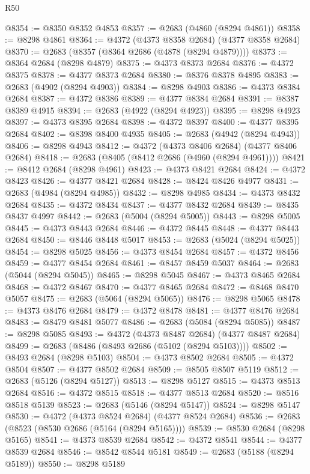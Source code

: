 \begin{lexlean}{R50}
\begin{coremodule}
@8354 := @8350 @8352 @4853
@8357 := @2683 (@4860 (@8294 @4861))
@8358 := @8298 @4861
@8364 := @4372 (@4373 @8358 @2684) (@4377 @8358 @2684)
@8370 := @2683 (@8357 (@8364 @2686 (@4878 (@8294 @4879))))
@8373 := @8364 @2684 (@8298 @4879)
@8375 := @4373 @8373 @2684
@8376 := @4372 @8375
@8378 := @4377 @8373 @2684
@8380 := @8376 @8378 @4895
@8383 := @2683 (@4902 (@8294 @4903))
@8384 := @8298 @4903
@8386 := @4373 @8384 @2684
@8387 := @4372 @8386
@8389 := @4377 @8384 @2684
@8391 := @8387 @8389 @4915
@8394 := @2683 (@4922 (@8294 @4923))
@8395 := @8298 @4923
@8397 := @4373 @8395 @2684
@8398 := @4372 @8397
@8400 := @4377 @8395 @2684
@8402 := @8398 @8400 @4935
@8405 := @2683 (@4942 (@8294 @4943))
@8406 := @8298 @4943
@8412 := @4372 (@4373 @8406 @2684) (@4377 @8406 @2684)
@8418 := @2683 (@8405 (@8412 @2686 (@4960 (@8294 @4961))))
@8421 := @8412 @2684 (@8298 @4961)
@8423 := @4373 @8421 @2684
@8424 := @4372 @8423
@8426 := @4377 @8421 @2684
@8428 := @8424 @8426 @4977
@8431 := @2683 (@4984 (@8294 @4985))
@8432 := @8298 @4985
@8434 := @4373 @8432 @2684
@8435 := @4372 @8434
@8437 := @4377 @8432 @2684
@8439 := @8435 @8437 @4997
@8442 := @2683 (@5004 (@8294 @5005))
@8443 := @8298 @5005
@8445 := @4373 @8443 @2684
@8446 := @4372 @8445
@8448 := @4377 @8443 @2684
@8450 := @8446 @8448 @5017
@8453 := @2683 (@5024 (@8294 @5025))
@8454 := @8298 @5025
@8456 := @4373 @8454 @2684
@8457 := @4372 @8456
@8459 := @4377 @8454 @2684
@8461 := @8457 @8459 @5037
@8464 := @2683 (@5044 (@8294 @5045))
@8465 := @8298 @5045
@8467 := @4373 @8465 @2684
@8468 := @4372 @8467
@8470 := @4377 @8465 @2684
@8472 := @8468 @8470 @5057
@8475 := @2683 (@5064 (@8294 @5065))
@8476 := @8298 @5065
@8478 := @4373 @8476 @2684
@8479 := @4372 @8478
@8481 := @4377 @8476 @2684
@8483 := @8479 @8481 @5077
@8486 := @2683 (@5084 (@8294 @5085))
@8487 := @8298 @5085
@8493 := @4372 (@4373 @8487 @2684) (@4377 @8487 @2684)
@8499 := @2683 (@8486 (@8493 @2686 (@5102 (@8294 @5103))))
@8502 := @8493 @2684 (@8298 @5103)
@8504 := @4373 @8502 @2684
@8505 := @4372 @8504
@8507 := @4377 @8502 @2684
@8509 := @8505 @8507 @5119
@8512 := @2683 (@5126 (@8294 @5127))
@8513 := @8298 @5127
@8515 := @4373 @8513 @2684
@8516 := @4372 @8515
@8518 := @4377 @8513 @2684
@8520 := @8516 @8518 @5139
@8523 := @2683 (@5146 (@8294 @5147))
@8524 := @8298 @5147
@8530 := @4372 (@4373 @8524 @2684) (@4377 @8524 @2684)
@8536 := @2683 (@8523 (@8530 @2686 (@5164 (@8294 @5165))))
@8539 := @8530 @2684 (@8298 @5165)
@8541 := @4373 @8539 @2684
@8542 := @4372 @8541
@8544 := @4377 @8539 @2684
@8546 := @8542 @8544 @5181
@8549 := @2683 (@5188 (@8294 @5189))
@8550 := @8298 @5189

\end{coremodule}
\end{lexlean}
